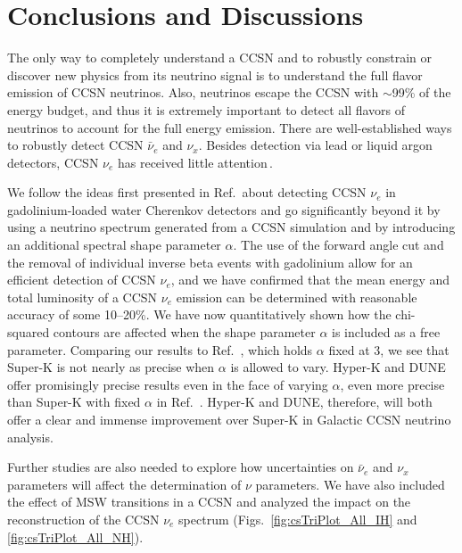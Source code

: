 \documentclass[aps,reprint,superscriptaddress]{revtex4-1}
\begin{document}
\section{Conclusions and Discussions} \label{sec:conclusions}

The only way to completely understand a CCSN and to robustly constrain or discover new physics from its neutrino signal is to understand the full flavor emission of  CCSN  neutrinos.  Also, neutrinos escape the  CCSN  with $\sim$99\% of the energy budget, and thus it is extremely important to detect all flavors of neutrinos to account for the full energy emission.  There are well-established ways to robustly detect  CCSN  $\bar{\nu}_e$ and $\nu_x$.  Besides detection via lead or liquid argon detectors,  CCSN  $\nu_e$ has received little attention\,\cite{Laha:2013hva}.

We follow the ideas first presented in Ref.\,\cite{Laha:2013hva} about detecting CCSN  $\nu_e$ in gadolinium-loaded water Cherenkov detectors and go significantly beyond it by using a neutrino spectrum generated from a  CCSN  simulation and by introducing an additional spectral shape parameter $\alpha$.  The use of the forward angle cut and the removal of individual inverse beta events with gadolinium allow for an efficient detection of  CCSN  $\nu_e$, and we have confirmed that the mean energy and total luminosity of a  CCSN  $\nu_e$ emission can be determined with reasonable accuracy of some 10--20\%.  We have now quantitatively shown how the chi-squared contours are affected when the shape parameter $\alpha$ is included as a free parameter. Comparing our results to Ref.~\cite{Laha:2013hva}, which holds $\alpha$ fixed at 3, we see that Super-K is not nearly as precise when $\alpha$ is allowed to vary.  Hyper-K and DUNE offer promisingly precise results even in the face of varying $\alpha$, even more precise than Super-K with fixed $\alpha$ in Ref.~\cite{Laha:2013hva}. Hyper-K and DUNE, therefore, will both offer a clear and immense improvement over Super-K in Galactic  CCSN  neutrino analysis.

Further studies are also needed to explore how uncertainties on $\bar{\nu}_e$ and $\nu_x$ parameters will affect the determination of $\nu$ parameters.  We have also included the effect of MSW transitions in a  CCSN  and analyzed the impact on the reconstruction of the  CCSN  $\nu_e$ spectrum (Figs.~\ref{fig:csTriPlot_All_IH} and \ref{fig:csTriPlot_All_NH}).  
\end{document}
